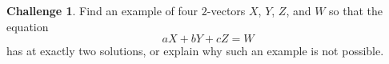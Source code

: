 \documentclass{tufte-book}
\theoremstyle{definition}
\newtheorem{task}{Task}
\newtheorem{challenge}[task]{Challenge}
\begin{document}
\begin{challenge}
Find an example of four $2$-vectors $X$, $Y$, $Z$, and $W$ so that the equation
\[
aX+bY+cZ = W
\]
has at exactly two solutions, or explain why such an example is not possible.
\end{challenge}








%
%
\end{document}
